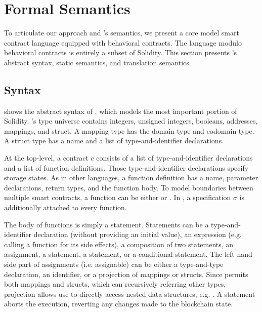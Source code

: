 \section{Formal Semantics} \label{sec:model}

To articulate our approach and \lang's semantics, we present a core model
smart contract language \corelang equipped with
behavioral contracts. The language modulo behavioral
contracts is entirely a subset of Solidity.
This section presents \corelang's abstract syntax, static semantics, and
translation semantics.



\subsection{Syntax}

 shows the abstract syntax of \corelang,
which models the most important portion of Solidity.
\corelang's type universe contains integers, unsigned integers, booleans,
addresses, mappings, and struct.
A mapping type has the domain type and codomain type.
A struct type has a name and a list of type-and-identifier declarations.

At the top-level, a contract $c$ consists of a list of type-and-identifier
declarations and a list of function definitions.
Those type-and-identifier declarations specify storage states.
As in other languages, a function definition has a name, parameter
declarations, return types, and the function body.  To model boundaries between
multiple smart contracts, a function can be either  or
.
In \corelang, a specification $\sigma$ is additionally attached to every function.

The body of functions is simply a statement.
Statements can be a type-and-identifier declaration (without providing an initial
value), an expression (e.g. calling a function for its side effects), a
composition of two statements, an assignment, a  statement, a  statement,
or a conditional statement.
The left-hand side part of assignments (i.e. assignable) can be either
a type-and-type declaration, an identifier, or a projection of mappings or structs.
Since \corelang permits both mappings and structs, which can recursively referring
other types, projection allows use to directly access nested data structures,
e.g. .
A  statement aborts the execution, reverting any changes made to
the blockchain state.


